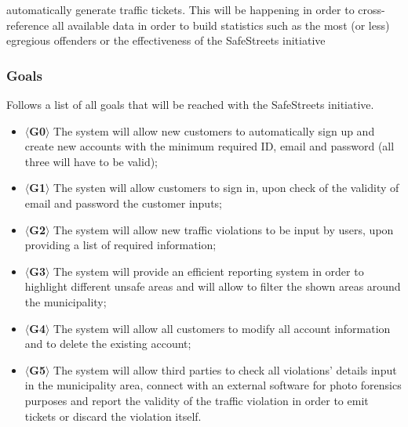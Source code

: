 \documentclass{article}
\begin{document}
    automatically generate traffic tickets. This will be happening in order to
    cross-reference all available data in order to build statistics such as the
    most (or less) egregious offenders or the effectiveness of the SafeStreets
    initiative \subsubsection{Goals} Follows a list of all goals that will be
    reached with the SafeStreets initiative.
    \begin{itemize}
        \item $\langle$\textbf{G0}$\rangle$ The system will allow new customers
        to automatically sign up and create new accounts with the minimum
        required ID, email and password (all three will have to be valid);
        \item $\langle$\textbf{G1}$\rangle$ The systen will allow customers to
        sign in, upon check of the validity of email and password the customer
        inputs;
        \item $\langle$\textbf{G2}$\rangle$ The system will allow new traffic
        violations to be input by users, upon providing a list of required
        information;
        \item $\langle$\textbf{G3}$\rangle$ The system will provide an efficient
        reporting system in order to highlight different unsafe areas and will
        allow to filter the shown areas around the municipality; 
        \item $\langle$\textbf{G4}$\rangle$ The system will allow all customers
        to modify all account information and to delete the existing account; 
        \item $\langle$\textbf{G5}$\rangle$ The system will allow third parties
        to check all violations' details input in the municipality area, connect
        with an external software for photo forensics purposes and report the
        validity of the traffic violation in order to emit tickets or discard
        the violation itself.
    \end{itemize}
\end{document}
